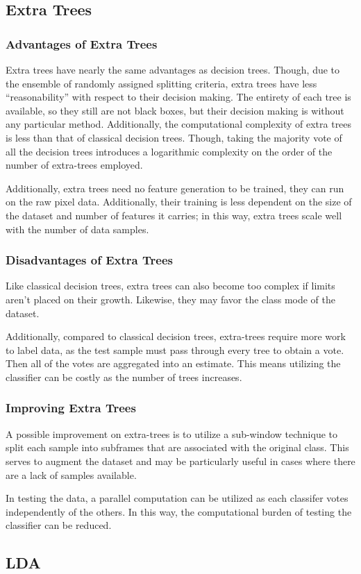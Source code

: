 \subsection{Extra Trees}
\subsubsection{Advantages of Extra Trees}

Extra trees have nearly the same advantages as decision trees. Though, due to the ensemble of randomly assigned splitting criteria, extra trees have less ``reasonability'' with respect to their decision making. The entirety of each tree is available, so they still are not black boxes, but their decision making is without any particular method. Additionally, the computational complexity of extra trees is less than that of classical decision trees. Though, taking the majority vote of all the decision trees introduces a logarithmic complexity on the order of the number of extra-trees employed. 

Additionally, extra trees need no feature generation to be trained, they can run on the raw pixel data. Additionally, their training is less dependent on the size of the dataset and number of features it carries; in this way, extra trees scale well with the number of data samples.

\subsubsection{Disadvantages of Extra Trees}

Like classical decision trees, extra trees can also become too complex if limits aren't placed on their growth. Likewise, they may favor the class mode of the dataset. 

Additionally, compared to classical decision trees, extra-trees require more work to label data, as the test sample must pass through every tree to obtain a vote. Then all of the votes are aggregated into an estimate. This means utilizing the classifier can be costly as the number of trees increases.

\subsubsection{Improving Extra Trees}

A possible improvement on extra-trees is to utilize a sub-window technique to split each sample into subframes that are associated with the original class. This serves to augment the dataset and may be particularly useful in cases where there are a lack of samples available. 

In testing the data, a parallel computation can be utilized as each classifer votes independently of the others. In this way, the computational burden of testing the classifier can be reduced.

\subsection{LDA}
